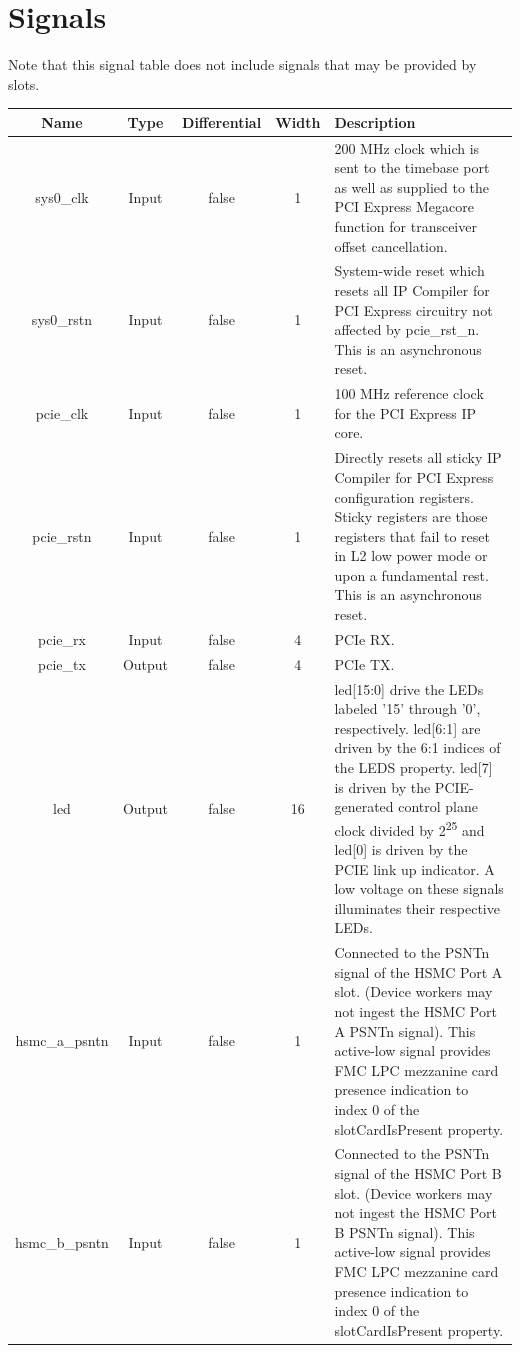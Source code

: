 \documentclass{article}
\begin{document}
\section*{Signals}
Note that this signal table does not include signals that may be provided by slots. \\
\begin{tabular}{|c|c|c|c|p{8cm}|}
	\hline
	\rowcolor{blue}
	Name           & Type   & Differential & Width & Description                                          \\
	\hline
	sys0\_clk      & Input  & false        & 1     & 200 MHz clock which is sent to the timebase port as well as supplied to the PCI Express Megacore function for transceiver offset cancellation\footnotemark.    \\
	\hline
	sys0\_rstn     & Input  & false        & 1     & System-wide reset which resets all IP Compiler for PCI Express circuitry not affected by pcie\_rst\_n. This is an asynchronous reset. \\
	\hline
	pcie\_clk      & Input  & false        & 1     & 100 MHz reference clock for the PCI Express IP core. \\
	\hline
	pcie\_rstn    & Input  & false        & 1     & Directly resets all sticky IP Compiler for PCI Express configuration registers. Sticky registers are those registers that fail to reset in L2 low power mode or upon a fundamental rest. This is an asynchronous reset.                                          \\
	\hline
	pcie\_rx       & Input  & false        & 4     & PCIe RX.                                             \\
	\hline
	pcie\_tx       & Output & false        & 4     & PCIe TX.                                             \\
	\hline
	led            & Output & false        & 16    & led[15:0] drive the LEDs labeled '15' through '0', respectively. led[6:1] are driven by the 6:1 indices of the LEDS property. led[7] is driven by the PCIE-generated control plane clock divided by 2\textsuperscript{25} and led[0] is driven by the PCIE link up indicator. A low voltage on these signals illuminates their respective LEDs.\\
	\hline
	hsmc\_a\_psntn          & Input & false & 1    & Connected to the PSNTn signal of the HSMC Port A slot. (Device workers may not ingest the HSMC Port A PSNTn signal). This active-low signal provides FMC LPC mezzanine card presence indication to index 0 of the slotCardIsPresent property.         \\
	\hline
	hsmc\_b\_psntn          & Input & false & 1    & Connected to the PSNTn signal of the HSMC Port B slot. (Device workers may not ingest the HSMC Port B PSNTn signal). This active-low signal provides FMC LPC mezzanine card presence indication to index 0 of the slotCardIsPresent property. \\
	\hline
\end{tabular}
\pagebreak
\end{document}
